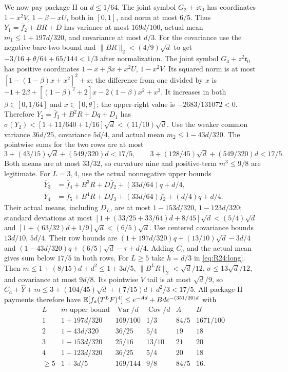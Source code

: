 We now pay package II on $d\le1/64$.
The joint symbol $G_2+z\mathfrak r_0$ has coordinates
$1-x^2V$, $1-\beta-xU$, both in $[0,1]$, and norm at most $6/5$.
Thus $Y_1=\bar f_2+BR+D$ has variance at most $169d/100$,
actual mean $m_1\le1+197d/320$, and covariance at most $d/3$.
For the covariance use the negative bare-two bound and
$\|BR\|_2<(4/9)\sqrt d$ to get
$-3/16+\theta/64+65/144<1/3$ after normalization.
The joint symbol $G_3+z^2\mathfrak r_0$ has positive coordinates
$1-x+\beta x+x^2U$, $1-x^2V$.
Its squared norm is at most $[1-(1-\beta)x+x^2]^2+x$;
the difference from one divided by $x$ is
$-1+2\beta+[(1-\beta)^2+2]x-2(1-\beta)x^2+x^3$.
It increases in both $\beta\in[0,1/64]$ and $x\in[0,\theta]$;
the upper-right value is $-2683/131072<0$.
Therefore $Y_2=\bar f_3+B^2R+Dq+D_1$ has
$\sigma(Y_2)<[1+11/640+1/16]\sqrt d<(11/10)\sqrt d$.
Use the weaker common variance $36d/25$, covariance $5d/4$, and
actual mean $m_2\le1-43d/320$.
The pointwise sums for the two rows are at most
\[
3+(43/15)\sqrt d+(549/320)d<17/5,\qquad
3+(128/45)\sqrt d+(549/320)d<17/5.
\]
Both means are at most $33/32$, so curvature nine and positive-term
$m^3\le9/8$ are legitimate.
For $L=3,4$, use the actual nonnegative upper bounds
\[
\begin{aligned}
\overline Y_3&=\bar f_4+B^3R+D\bar f_2+(33d/64)q+d/4,\\
\overline Y_4&=\bar f_5+B^4R+D\bar f_3+(33d/64)\bar f_2+(d/4)q+d/4.
\end{aligned}
\]
Their actual means, including $D_L$, are at most
$1-153d/320$, $1-123d/320$; standard deviations at most
$[1+(33/25+33/64)d+8/45]\sqrt d<(5/4)\sqrt d$ and
$[1+(63/32)d+1/9]\sqrt d<(6/5)\sqrt d$.
Use centered covariance bounds $13d/10$, $5d/4$.
Their row bounds are
$(1+197d/320)q+(13/10)\sqrt d-3d/4$ and
$(1-43d/320)q+(6/5)\sqrt d-\tau+d/4$.
Adding $C_a$ and the actual mean gives sum below $17/5$ in both rows.
For $L\ge5$ take $h=d/3$ in \eqref{eq:R24:long}.
Then $m\le1+(8/15)d+d^2\le1+3d/5$,
$\|B^LR\|_2<\sqrt d/12$, $\sigma\le13\sqrt d/12$,
and covariance at most $9d/8$.
Its pointwise $V$ tail is at most $\sqrt d/9$, so
$C_a+\widehat Y+m\le3+(104/45)\sqrt d+(7/15)d+d^2/3<17/5$.
All package-II payments therefore have
$\mathbb E[f_a(T^LF)^4]\le e^{-Ad}+Bde^{-(351/20)d}$ with
\begin{equation}\tag{R24.5.table}\label{eq:R24:IIpayments}
\begin{array}{c|c|c|c|c|c}
L&m\text{ upper bound}&\operatorname{Var}/d&\operatorname{Cov}/d&A&B\\\hline
1&1+197d/320&169/100&1/3&84/5&1671/100\\
2&1-43d/320&36/25&5/4&19&18\\
3&1-153d/320&25/16&13/10&21&20\\
4&1-123d/320&36/25&5/4&20&18\\
\ge5&1+3d/5&169/144&9/8&84/5&16.
\end{array}
\end{equation}
